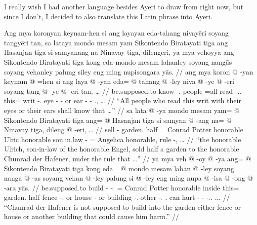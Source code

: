 \documentclass[12pt,paper=a4]{scrartcl}
\begin{document}
I really wish I had another language besides Ayeri to draw from right now, but 
since I don't, I decided to also translate this Latin phrase into Ayeri.


\pex
	\glpreamble Ang mya koronyan keynam-hen si ang layayan eda-tahang 
		nivayēri soyang tangyēri tan, sa lataya mondo mesam yam 
		Sikontendo Biratayati tiga ang Hasanjan tiga si samyanang na 
		Nina\-vay tiga, dilengeri, ya mya vehoyya ang Sikontendo 
		Biratayati tiga kong eda-mondo mesam lahanley soyang nangās 
		soyang vehanley palung siley eng ming nupisongara yās. //
	\a \begingl
		\gla ang mya koron @ -yan keynam @ =hen si ang laya @ -yan eda= 
		@ tahang @ -ley niva @ -ye @ -eri soyang tang @ -ye @ -eri tan, 
		… //
		\glb \AgtT{} be.supposed.to know -\Tpl{}.\M{} people =all \Rel{} 
			\AgtT{} read -\Tpl{}.\M{}.\Top{} this= writ 
			-\Parg{}.\Inan{} eye -\Pl{} -\Ins{} or ear -\Pl{} 
			-\Ins{} \Tpl{}.\Gen{}, … //
		\glft \enquote{All people who read this writ with their eyes or 
			their ears shall know that …} //
	\endgl
	\a \begingl
		\gla sa lata @ -ya mondo mesam yam= @ Sikontendo Biratayati tiga 
			ang= @ Hasanjan tiga si samyan @ -ang na= @ Ninavay tiga, 
			dileng @ -eri, … //
		\glb \PatT{} sell -\Tsg{} garden.\Top{} half \Dat{}= Conrad 
			Potter honorable \Aarg{}= Ulric honorable \Rel{} 
			son.in.law -\Aarg{} \Gen{}= Angelica honorable, rule 
			-\Ins{}, … //
		\glft \enquote{the honorable Ulrich, son-in-law of the honorable 
			Engel, sold half a garden to the honorable Chunrad der 
			Hafener, under the rule that …} //
	\endgl
	\a \begingl
		\gla ya mya veh @ -oy @ -ya ang= @ Sikontendo Biratayati tiga 
			kong eda= @ mondo mesam lahan @ -ley soyang nanga @ -as 
			soyang vehan @ -ley palung si @ -ley eng ming nupa @ 
			-isa @ -ong @ -ara yās. //
		\glb \LocT{} be.supposed.to build -\Neg{} -\Tsg{}.\M{} \Aarg{}= 
			Conrad Potter honorable inside this= garden.\Top{} half 
			fence -\Parg{}.\Inan{} or house -\Parg{} or building 
			-\Parg{}.\Inan{} other \Rel{} -\Parg{}.\Inan{} 
			\AgtT{}.\Inan{} can hurt -\Caus{} -\Irr{} 
			-\Tsg{}.\Inan{}.\Top{} \Tsg{}.\M{}.\Parg{}. //
		\glft \enquote{Chunrad der Hafener is not supposed to build into 
		the garden either fence or house or another building that could 
		cause him harm.} //
	\endgl
\xe
\end{document}
